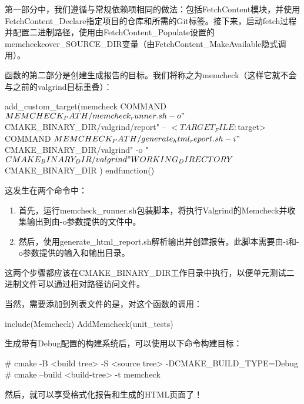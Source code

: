 

第一部分中，我们遵循与常规依赖项相同的做法：包括FetchContent模块，并使用FetchContent\_Declare指定项目的仓库和所需的Git标签。接下来，启动fetch过程并配置二进制路径，使用由FetchContent\_Populate设置的memcheckcover\_SOURCE\_DIR变量（由FetchContent\_MakeAvailable隐式调用）。

函数的第二部分是创建生成报告的目标。我们将称之为memcheck（这样它就不会与之前的valgrind目标重叠）：


\begin{cmake}
    add_custom_target(memcheck
        COMMAND ${MEMCHECK_PATH}/memcheck_runner.sh -o
            "${CMAKE_BINARY_DIR}/valgrind/report"
            -- $<TARGET_FILE:${target}>
        COMMAND ${MEMCHECK_PATH}/generate_html_report.sh
            -i "${CMAKE_BINARY_DIR}/valgrind"
            -o "${CMAKE_BINARY_DIR}/valgrind"
        WORKING_DIRECTORY ${CMAKE_BINARY_DIR}
    )
endfunction()
\end{cmake}

这发生在两个命令中：

\begin{enumerate}
\item
首先，运行memcheck\_runner.sh包装脚本，将执行Valgrind的Memcheck并收集输出到由-o参数提供的文件中。

\item
然后，使用generate\_html\_report.sh解析输出并创建报告。此脚本需要由-i和-o参数提供的输入和输出目录。
\end{enumerate}

这两个步骤都应该在CMAKE\_BINARY\_DIR工作目录中执行，以便单元测试二进制文件可以通过相对路径访问文件。

当然，需要添加到列表文件的是，对这个函数的调用：


\begin{cmake}
include(Memcheck)
AddMemcheck(unit_tests)
\end{cmake}

生成带有Debug配置的构建系统后，可以使用以下命令构建目标：

\begin{shell}
# cmake -B <build tree> -S <source tree> -DCMAKE_BUILD_TYPE=Debug
# cmake --build <build-tree> -t memcheck
\end{shell}

然后，就可以享受格式化报告和生成的HTML页面了！





